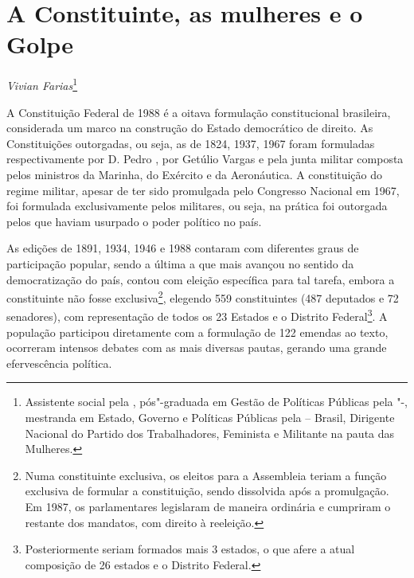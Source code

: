 \chapter*{A Constituinte, as mulheres e o Golpe}


\begin{flushright}
\emph{Vivian Farias}\footnote{Assistente social pela , pós"-graduada em
  Gestão de Políticas Públicas pela "-, mestranda em Estado,
  Governo e Políticas Públicas pela  -- Brasil, Dirigente Nacional
  do Partido dos Trabalhadores, Feminista e Militante na pauta das
  Mulheres.}
\end{flushright}

A Constituição Federal de 1988 é a oitava formulação constitucional
brasileira, considerada um marco na construção do Estado democrático de
direito. As Constituições outorgadas, ou seja, as de 1824, 1937, 1967
foram formuladas respectivamente por D. Pedro , por Getúlio Vargas e
pela junta militar composta pelos ministros da Marinha, do Exército e da
Aeronáutica. A constituição do regime militar, apesar de ter sido
promulgada pelo Congresso Nacional em 1967, foi formulada exclusivamente
pelos militares, ou seja, na prática foi outorgada pelos que haviam
usurpado o poder político no país.

As edições de 1891, 1934, 1946 e 1988 contaram com diferentes graus de
participação popular, sendo a última a que mais avançou no sentido da
democratização do país, contou com eleição específica para tal tarefa,
embora a constituinte não fosse exclusiva\footnote{Numa constituinte
  exclusiva, os eleitos para a Assembleia teriam a função exclusiva de
  formular a constituição, sendo dissolvida após a promulgação. Em 1987,
  os parlamentares legislaram de maneira ordinária e cumpriram o
  restante dos mandatos, com direito à reeleição.}, elegendo 559
constituintes (487 deputados e 72 senadores), com representação de todos
os 23 Estados e o Distrito Federal\footnote{Posteriormente seriam
  formados mais 3 estados, o que afere a atual composição de 26 estados
  e o Distrito Federal.}. A população participou diretamente com a
formulação de 122 emendas ao texto, ocorreram intensos debates com as
mais diversas pautas, gerando uma grande efervescência política.

